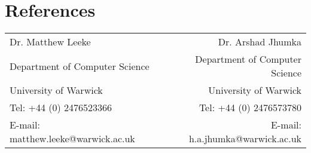 \documentclass[11pt]{article}
\begin{document}
   \section*{References}
     \begin{tabularx}{\linewidth}{ l X r }
Dr. Matthew Leeke && Dr. Arshad Jhumka \\
Department of Computer Science && Department of Computer Science \\
University of Warwick && University of Warwick \\
Tel: +44 (0) 2476523366 && Tel: +44 (0) 2476573780 \\
E-mail: matthew.leeke@warwick.ac.uk && E-mail: h.a.jhumka@warwick.ac.uk 
    \end{tabularx}
\end{document}
